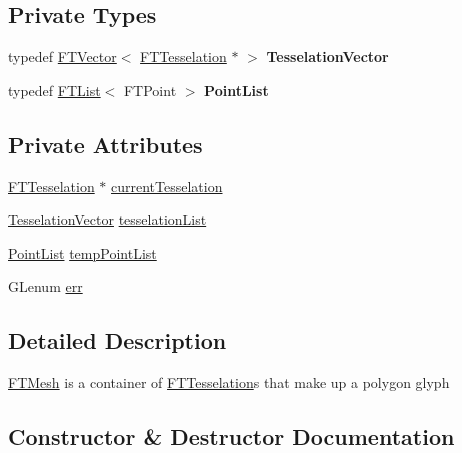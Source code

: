 \subsection*{Private Types}
\begin{DoxyCompactItemize}
\item 
typedef \hyperlink{class_f_t_vector}{F\+T\+Vector}$<$ \hyperlink{class_f_t_tesselation}{F\+T\+Tesselation} $\ast$ $>$ {\bfseries Tesselation\+Vector}\hypertarget{class_f_t_mesh_a3248d8f80b6de427e04e70bd8bb47f14}{}\label{class_f_t_mesh_a3248d8f80b6de427e04e70bd8bb47f14}

\item 
typedef \hyperlink{class_f_t_list}{F\+T\+List}$<$ F\+T\+Point $>$ {\bfseries Point\+List}\hypertarget{class_f_t_mesh_a47ae011d4169cbfc5be27e9764dec0f9}{}\label{class_f_t_mesh_a47ae011d4169cbfc5be27e9764dec0f9}

\end{DoxyCompactItemize}
\subsection*{Private Attributes}
\begin{DoxyCompactItemize}
\item 
\hyperlink{class_f_t_tesselation}{F\+T\+Tesselation} $\ast$ \hyperlink{class_f_t_mesh_a1352fa66154a24590b6ed4f27c65f1ec}{current\+Tesselation}
\item 
\hyperlink{class_f_t_vector}{Tesselation\+Vector} \hyperlink{class_f_t_mesh_a1b32e89cf5def0c7b54e07d7034ae6ae}{tesselation\+List}
\item 
\hyperlink{class_f_t_list}{Point\+List} \hyperlink{class_f_t_mesh_a2d33ccfb8c6be7f7b1df735881322dc9}{temp\+Point\+List}
\item 
G\+Lenum \hyperlink{class_f_t_mesh_a5a25a6603f00ce812e43b0362d2882a5}{err}
\end{DoxyCompactItemize}


\subsection{Detailed Description}
\hyperlink{class_f_t_mesh}{F\+T\+Mesh} is a container of \hyperlink{class_f_t_tesselation}{F\+T\+Tesselation}\textquotesingle{}s that make up a polygon glyph 

\subsection{Constructor \& Destructor Documentation}
